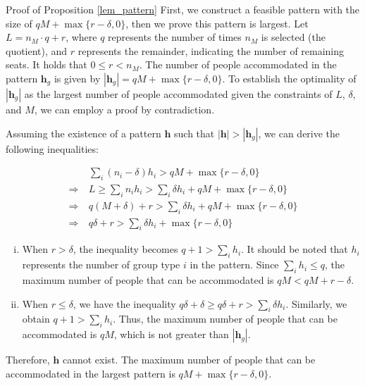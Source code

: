 \begin{pf}{Proof of Proposition \ref{lem_pattern}}
First, we construct a feasible pattern with the size of $qM + \max\{r-\delta, 0\}$, then we prove this pattern is largest. Let $L = n_M \cdot q + r$, where $q$ represents the number of times $n_M$ is selected (the quotient), and $r$ represents the remainder, indicating the number of remaining seats. It holds that $0 \leq r < n_M$. The number of people accommodated in the pattern $\bm{h}_{g}$ is given by $|\bm{h}_{g}| = q M + \max\{r-\delta, 0\}$. To establish the optimality of $|\bm{h}_{g}|$ as the largest number of people accommodated given the constraints of $L$, $\delta$, and $M$, we can employ a proof by contradiction.

Assuming the existence of a pattern $\bm{h}$ such that $|\bm{h}| > |\bm{h}_{g}|$, we can derive the following inequalities:

\begin{align*}
  & \sum_{i} (n_i - \delta) h_i > q M + \max\{r-\delta, 0\} \\
  \Rightarrow ~& L \geq \sum_{i} n_i h_i > \sum_{i} \delta h_i + q M + \max\{r-\delta, 0\} \\
  \Rightarrow ~& q(M + \delta) + r > \sum_{i} \delta h_i + q M + \max\{r-\delta, 0\} \\
  \Rightarrow ~& q \delta + r > \sum_{i} \delta h_i + \max\{r-\delta, 0\}
\end{align*}

\begin{enumerate}[(i)]
  \item When $r > \delta$, the inequality becomes $q+1 > \sum_{i} h_i$. It should be noted that $h_i$ represents the number of group type $i$ in the pattern. Since $\sum_{i} h_i \leq q$, the maximum number of people that can be accommodated is $q M < q M + r-\delta$.  
  \item When $r \leq \delta$, we have the inequality $q \delta + \delta \geq q \delta + r > \sum_{i} \delta h_i$. Similarly, we obtain $q+1 > \sum_{i} h_i$. Thus, the maximum number of people that can be accommodated is $q M$, which is not greater than $|\bm{h}_{g}|$.  
\end{enumerate}

Therefore, $\bm{h}$ cannot exist. The maximum number of people that can be accommodated in the largest pattern is $q M + \max\{r-\delta, 0\}$.
\end{pf}

